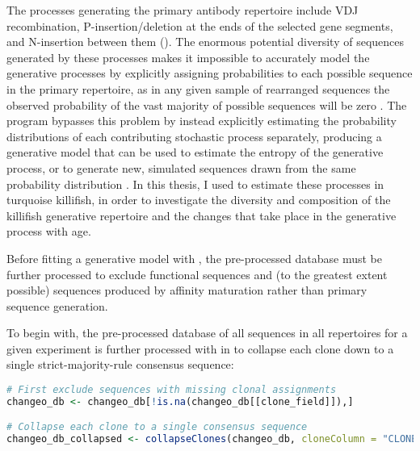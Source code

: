 The processes generating the primary antibody repertoire include VDJ recombination, P-insertion/deletion at the ends of the selected gene segments, and N-insertion between them (). The enormous potential diversity of sequences generated by these processes makes it impossible to accurately model the generative processes by explicitly assigning probabilities to each possible sequence in the primary repertoire, as in any given sample of rearranged sequences the observed probability of the vast majority of possible sequences will be zero \parencite{marcou2018igor}. The program  bypasses this problem by instead explicitly estimating the probability distributions of each contributing stochastic process separately, producing a generative model that can be used to estimate the entropy of the generative process, or to generate new, simulated sequences drawn from the same probability distribution \parencite{marcou2018igor}. In this thesis, I used  to estimate these processes in turquoise killifish, in order to investigate the diversity and composition of the killifish generative repertoire and the changes that take place in the generative process with age.


Before fitting a generative model with , the pre-processed  database must be further processed to exclude functional sequences and (to the greatest extent possible) sequences produced by affinity maturation rather than primary sequence generation.

To begin with, the pre-processed  database of all sequences in all repertoires for a given experiment is further processed with  \parencite{gupta2015changeo} in  to collapse each clone down to a single strict-majority-rule consensus sequence:

\begin{lstlisting}[language=R]
# First exclude sequences with missing clonal assignments
changeo_db <- changeo_db[!is.na(changeo_db[[clone_field]]),]

# Collapse each clone to a single consensus sequence
changeo_db_collapsed <- collapseClones(changeo_db, cloneColumn = "CLONE", sequenceColumn = "SEQUENCE_IMGT", germlineColumn = "GERMLINE_IMGT_D_MASK", method = "mostCommon", includeAmbiguous = FALSE, breakTiesStochastic = FALSE, expandedDb = NULL)
\end{lstlisting}

